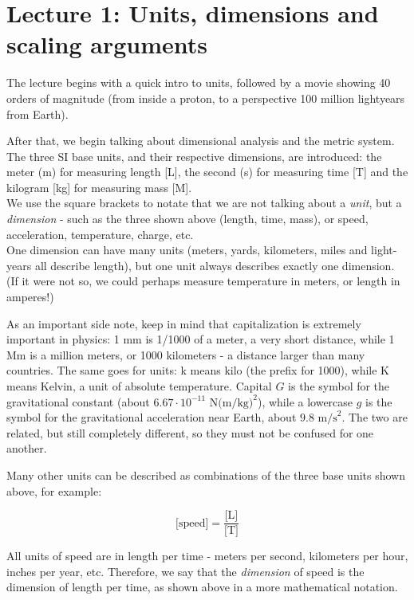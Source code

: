 
\section{Lecture 1: Units, dimensions and scaling arguments}

The lecture begins with a quick intro to units, followed by a movie showing 40 orders of magnitude (from inside a proton, to a perspective 100 million lightyears from Earth).

After that, we begin talking about dimensional analysis and the metric system.
The three SI base units, and their respective dimensions, are introduced: the meter (m) for measuring length [L], the second (s) for measuring time [T] and the kilogram [kg] for measuring mass [M].\\
We use the square brackets to notate that we are not talking about a \emph{unit}, but a \emph{dimension} - such as the three shown above (length, time, mass), or speed, acceleration, temperature, charge, etc.\\
One dimension can have many units (meters, yards, kilometers, miles and light-years all describe length), but one unit always describes exactly one dimension. (If it were not so, we could perhaps measure temperature in meters, or length in amperes!)

As an important side note, keep in mind that capitalization is extremely important in physics: 1 mm is 1/1000 of a meter, a very short distance, while 1 Mm is a million meters, or 1000 kilometers - a distance larger than many countries. The same goes for units: k means kilo (the prefix for 1000), while K means Kelvin, a unit of absolute temperature. Capital $G$ is the symbol for the gravitational constant (about $6.67 \cdot 10^{-11} \text{ N(m/kg)}^2$), while a lowercase $g$ is the symbol for the gravitational acceleration near Earth, about $9.8 \text{ m/s}^2$. The two are related, but still completely different, so they must not be confused for one another.

Many other units can be described as combinations of the three base units shown above, for example:

\begin{equation}
 \text{[speed]} = \frac{\text{[L]}}{\text{[T]}}
\end{equation}

All units of speed are in length per time - meters per second, kilometers per hour, inches per year, etc. Therefore, we say that the \emph{dimension} of speed is the dimension of length per time, as shown above in a more mathematical notation.

